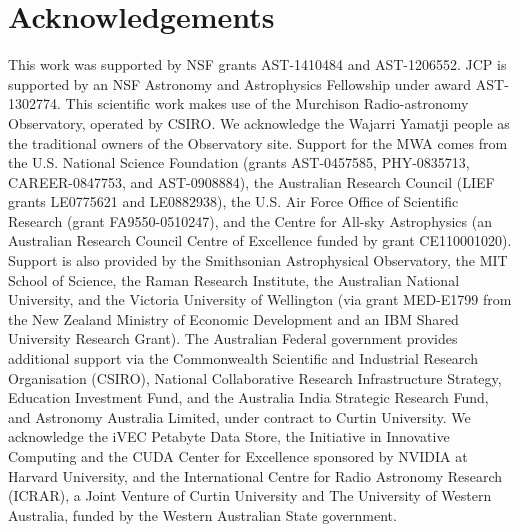\documentclass[iop]{emulateapj}
\begin{document}
\section{Acknowledgements}
This work was supported by NSF grants AST-1410484 and AST-1206552.
JCP is supported by an NSF Astronomy and Astrophysics Fellowship under award 
AST-1302774. This scientific work makes use of the Murchison Radio-astronomy 
Observatory, operated by CSIRO. We acknowledge the Wajarri Yamatji people as the 
traditional owners of the Observatory site. Support for the MWA comes from the U.S. 
National Science Foundation (grants AST-0457585, PHY-0835713, CAREER-0847753, and 
AST-0908884), the Australian Research Council (LIEF grants LE0775621 and LE0882938), 
the U.S. Air Force Office of Scientific Research (grant FA9550-0510247), and the Centre for 
All-sky Astrophysics (an Australian Research Council Centre of Excellence funded by grant 
CE110001020). Support is also provided by the Smithsonian Astrophysical Observatory, the 
MIT School of Science, the Raman Research Institute, the Australian National University, 
and the Victoria University of Wellington (via grant MED-E1799 from the New Zealand 
Ministry of Economic Development and an IBM Shared University Research Grant). The 
Australian Federal government provides additional support via the Commonwealth Scientific 
and Industrial Research Organisation (CSIRO), National Collaborative Research 
Infrastructure Strategy, Education Investment Fund, and the Australia India Strategic 
Research Fund, and Astronomy Australia Limited, under contract to Curtin University. We 
acknowledge the iVEC Petabyte Data Store, the Initiative in Innovative Computing and the 
CUDA Center for Excellence sponsored by NVIDIA at Harvard University, and the 
International Centre for Radio Astronomy Research (ICRAR), a Joint Venture of Curtin 
University and The University of Western Australia, funded by the Western Australian State 
government.


\end{document}
